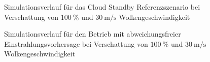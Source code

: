 \begin{figure}[h!]
    \centering
    \setlength{\fboxsep}{1pt}
    \setlength{\fboxrule}{1pt}
    \caption[Simulationsverlauf für das Cloud Standby Referenzszenario bei Verschattung von $\SI{100}{\percent}$ und $\SI{30}{\metre\per\second}$ Wolkengeschwindigkeit]{Simulationsverlauf für das Cloud Standby Referenzszenario bei Verschattung von $\SI{100}{\percent}$ und $\SI{30}{\metre\per\second}$ Wolkengeschwindigkeit}
    \label{fig_cloudstandby0030}
\end{figure}

\begin{figure}[h!]
    \centering
    \setlength{\fboxsep}{1pt}
    \setlength{\fboxrule}{1pt}
    \caption[Simulationsverlauf für den Betrieb mit abweichungsfreier Einstrahlungsvorhersage bei Verschattung von $\SI{100}{\percent}$ und $\SI{30}{\metre\per\second}$ Wolkengeschwindigkeit]{Simulationsverlauf für den Betrieb mit abweichungsfreier Einstrahlungsvorhersage bei Verschattung von $\SI{100}{\percent}$ und $\SI{30}{\metre\per\second}$ Wolkengeschwindigkeit}
    \label{fig_allwissend0030}
\end{figure}

